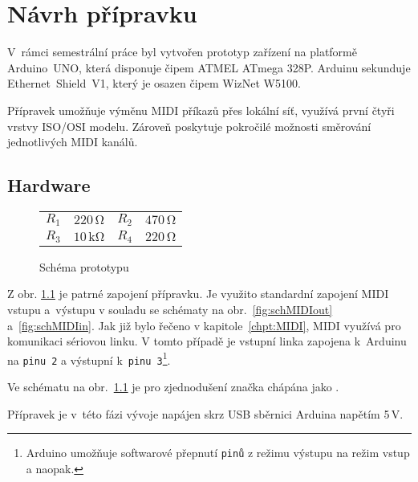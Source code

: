 
\chapter{Návrh přípravku}
V~rámci semestrální práce byl vytvořen prototyp zařízení na platformě Arduino~UNO, která disponuje čipem ATMEL ATmega 328P. Arduinu sekunduje \linebreak Ethernet~Shield~V1, který je osazen čipem WizNet W5100. 

Přípravek umožňuje výměnu \acs{MIDI} příkazů přes lokální síť, využívá první čtyři vrstvy ISO/OSI modelu. Zároveň poskytuje pokročilé možnosti směrování jednotlivých \acs{MIDI} kanálů.

\section{Hardware}\label{chpt:Schema}
\begin{figure}[h]
    \centering
    
    \begin{tabular}{l c l c}
        \small
        $R_1$ & $220\,\mathrm{\Omega}$ & $R_2$ & $470\,\mathrm{\Omega}$ \\
        $R_3$ & $10\,\mathrm{k\Omega}$ & $R_4$ & $220\,\mathrm{\Omega}$
    \end{tabular}
    \caption{Schéma prototypu \cite{Indest}} 
    \label{fig:schPrototype}
\end{figure}

Z obr. \ref{fig:schPrototype} je patrné zapojení přípravku. Je využito standardní zapojení \acs{MIDI} vstupu a~výstupu v souladu se schématy na obr.~\ref{fig:schMIDIout} a~\ref{fig:schMIDIin}. Jak již bylo řečeno v kapitole~\ref{chpt:MIDI}, \acs{MIDI} využívá pro komunikaci sériovou linku. V tomto případě je vstupní linka zapojena k~Arduinu na \texttt{pinu~2} a výstupní k~\texttt{pinu~3}\footnote{Arduino umožňuje softwarové přepnutí \texttt{pinů} z režimu výstupu na režim vstup a naopak.}. 

Ve schématu na obr.~\ref{fig:schPrototype} je pro zjednodušení značka  chápána jako .

Přípravek je v~této fázi vývoje napájen skrz \acs{USB} sběrnici Arduina napětím 5\,\unit{V}. 


